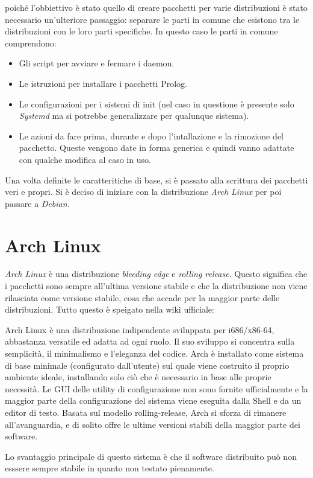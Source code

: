 \documentclass[10pt,titlepage,twoside,a4paper]{report}
\begin{document}
poiché l'obbiettivo è stato quello di creare pacchetti per varie 
distribuzioni è stato necessario un'ulteriore passaggio: separare le parti in 
comune che esistono tra le distribuzioni con le loro parti specifiche. In 
questo caso le parti in comune comprendono:
\begin{itemize}
    \item Gli script per avviare e fermare i daemon.
    \item Le istruzioni per installare i pacchetti Prolog.
    \item Le configurazioni per i sistemi di init (nel caso in questione è 
presente solo \emph{Systemd} ma si potrebbe generalizzare per qualunque 
sistema).
    \item Le azioni da fare prima, durante e dopo l'intallazione e la rimozione 
del pacchetto. Queste vengono date in forma generica e quindi vanno adattate 
con qualche modifica al caso in uso.
\end{itemize}

Una volta definite le caratteritiche di base, si è passato alla scrittura dei
pacchetti veri e propri. Si è deciso di iniziare con la
distribuzione \emph{Arch Linux} per poi passare a \emph{Debian}.


\section{Arch Linux}
\emph{Arch Linux} è una distribuzione \emph{bleeding edge} e \emph{rolling 
release}. Questo significa che i pacchetti sono sempre all'ultima versione 
stabile e che la distribuzione non viene rilasciata come versione stabile, 
cosa che accade per la maggior parte delle distribuzioni. Tutto questo è 
speigato nella wiki ufficiale\cite{archLinux}:
\begin{displayquote}
Arch Linux è una distribuzione indipendente sviluppata per i686/x86-64, 
abbastanza versatile ed adatta ad ogni ruolo. Il suo sviluppo si concentra 
sulla semplicità, il minimalismo e l'eleganza del codice. Arch è installato 
come sistema di base minimale (configurato dall'utente) sul quale viene 
costruito il proprio ambiente ideale, installando solo ciò che è necessario 
in base alle proprie necessità. Le GUI delle utility di configurazione non 
sono fornite ufficialmente e la maggior parte della configurazione del sistema viene 
eseguita dalla Shell e da un editor di testo. Basata sul modello 
rolling-release, Arch si sforza di rimanere all'avanguardia, e di solito offre 
le ultime versioni stabili della maggior parte dei software.
\end{displayquote}
Lo svantaggio principale di questo sistema è che il software distribuito 
può non esssere sempre stabile in quanto non testato pienamente.
\end{document}
